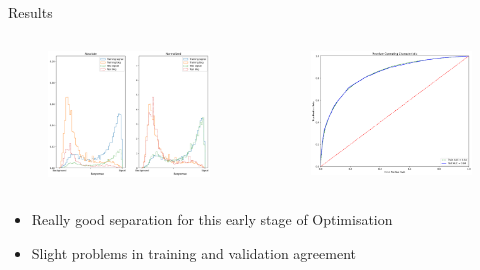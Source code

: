 \begin{frame}{Results}
\begin{columns}
  \begin{column}{0.5\textwidth}
    \begin{figure}
      \includegraphics[width=\textwidth]{response.png}
    \end{figure}
  \end{column}
  \begin{column}{0.5\textwidth}
    \begin{figure}
      \includegraphics[width=\textwidth]{ROC.png}
    \end{figure}
  \end{column}
\end{columns}
%
\begin{itemize}
  \item Really good separation for this early stage of Optimisation
  \item Slight problems in training and validation agreement
\end{itemize}
\end{frame}


